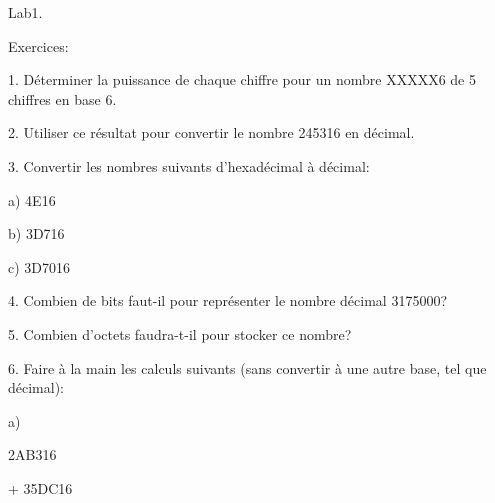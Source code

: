 \documentclass[a4paper,portrait,12pt]{article}
\begin{document}
\begin{flushleft}
Lab1.
\end{flushleft}


\begin{flushleft}
Exercices:
\end{flushleft}


\begin{flushleft}
1. D\'{e}terminer la puissance de chaque chiffre pour un nombre XXXXX6 de 5 chiffres en base 6.
\end{flushleft}


\begin{flushleft}
2. Utiliser ce r\'{e}sultat pour convertir le nombre 245316 en d\'{e}cimal.
\end{flushleft}


\begin{flushleft}
3. Convertir les nombres suivants d'hexad\'{e}cimal \`{a} d\'{e}cimal:
\end{flushleft}


\begin{flushleft}
a) 4E16
\end{flushleft}


\begin{flushleft}
b) 3D716
\end{flushleft}


\begin{flushleft}
c) 3D7016
\end{flushleft}


\begin{flushleft}
4. Combien de bits faut-il pour repr\'{e}senter le nombre d\'{e}cimal 3175000?
\end{flushleft}


\begin{flushleft}
5. Combien d'octets faudra-t-il pour stocker ce nombre?
\end{flushleft}


\begin{flushleft}
6. Faire \`{a} la main les calculs suivants (sans convertir \`{a} une autre base, tel que d\'{e}cimal):
\end{flushleft}


\begin{flushleft}
a)
\end{flushleft}


\begin{flushleft}
2AB316
\end{flushleft}


\begin{flushleft}
+ 35DC16
\end{flushleft}
\end{document}
